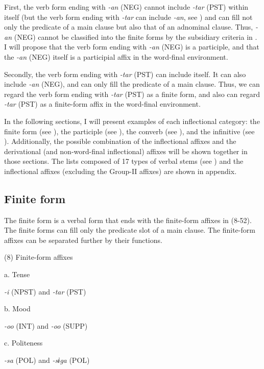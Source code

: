 First, the verb form ending with \textit{{}-an} (NEG) cannot include \textit{{}-tar} (PST) within itself (but the verb form ending with \textit{{}-tar} can include \textit{{}-an}, see ) and can fill not only the predicate of a main clause but also that of an adnominal clause. Thus, \textit{{}-an} (NEG) cannot be classified into the finite forms by the subsidiary criteria in . I will propose that the verb form ending with \textit{-an} (NEG) is a participle, and that the \textit{{}-an} (NEG) itself is a participial affix in the word-final environment.

Secondly, the verb form ending with \textit{{}-tar} (PST) can include itself. It can also include \textit{{}-an} (NEG), and can only fill the predicate of a main clause. Thus, we can regard the verb form ending with \textit{{}-tar} (PST) as a finite form, and also can regard \textit{{}-tar} (PST) as a finite-form affix in the word-final environment.

In the following sections, I will present examples of each inflectional category: the finite form (see ), the participle (see ), the converb (see ), and the infinitive (see ). Additionally, the possible combination of the inflectional affixes and the derivational (and non-word-final inflectional) affixes will be shown together in those sections. The lists composed of 17 types of verbal stems (see ) and the inflectional affixes (excluding the Group-II affixes) are shown in appendix.

\subsection{Finite form}

The finite form is a verbal form that ends with the finite-form affixes in (8-52). The finite forms can fill only the predicate slot of a main clause. The finite-form affixes can be separated further by their functions.

(8)  Finite-form affixes

  a.  Tense

    \textit{{}-i} (NPST) and \textit{{}-tar} (PST)

  b.  Mood

    \textit{{}-oo} (INT) and \textit{-oo} (SUPP)

  c.  Politeness

    \textit{{}-sa} (POL) and \textit{{}-sɨga} (POL)

